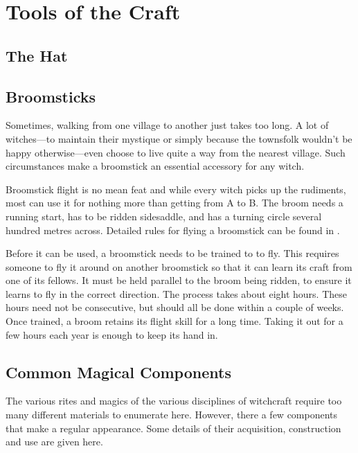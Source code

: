 \chapter{Tools of the Craft}

\section{The Hat}



\section{Broomsticks}

Sometimes, walking from one village to another just takes too long.
A lot of witches---to maintain their mystique or simply because the townsfolk wouldn't be happy otherwise---even choose to live quite a way from the nearest village.
Such circumstances make a broomstick an essential accessory for any witch.

Broomstick flight is no mean feat and while every witch picks up the rudiments, most can use it for nothing more than getting from A to B.
The broom needs a running start, has to be ridden sidesaddle, and has a turning circle several hundred metres across.
Detailed rules for flying a broomstick can be found in .

Before it can be used, a broomstick needs to be trained to to fly.
This requires someone to fly it around on another broomstick so that it can learn its craft from one of its fellows.
It must be held parallel to the broom being ridden, to ensure it learns to fly in the correct direction.
The process takes about eight hours.
These hours need not be consecutive, but should all be done within a couple of weeks.
Once trained, a broom retains its flight skill for a long time.
Taking it out for a few hours each year is enough to keep its hand in.



\section{Common Magical Components}

The various rites and magics of the various disciplines of witchcraft require too many different materials to enumerate here.
However, there a few components that make a regular appearance.
Some details of their acquisition, construction and use are given here.

